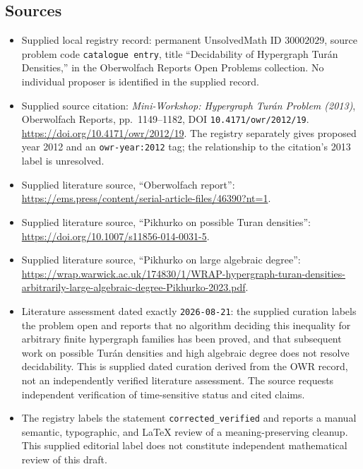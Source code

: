 \documentclass[11pt]{article}
\begin{document}
\subsection{Sources}
\begin{itemize}
\item Supplied local registry record: permanent UnsolvedMath ID \(30002029\), source problem code \texttt{catalogue entry}, title ``Decidability of Hypergraph Tur\'an Densities,'' in the Oberwolfach Reports Open Problems collection. No individual proposer is identified in the supplied record.
\item Supplied source citation: \emph{Mini-Workshop: Hypergraph Tur\'an Problem (2013)}, Oberwolfach Reports, pp.\ 1149--1182, DOI \texttt{10.4171/owr/2012/19}. \url{https://doi.org/10.4171/owr/2012/19}. The registry separately gives proposed year 2012 and an \texttt{owr-year:2012} tag; the relationship to the citation's 2013 label is unresolved.
\item Supplied literature source, ``Oberwolfach report'': \url{https://ems.press/content/serial-article-files/46390?nt=1}.
\item Supplied literature source, ``Pikhurko on possible Turan densities'': \url{https://doi.org/10.1007/s11856-014-0031-5}.
\item Supplied literature source, ``Pikhurko on large algebraic degree'': \url{https://wrap.warwick.ac.uk/174830/1/WRAP-hypergraph-turan-densities-arbitrarily-large-algebraic-degree-Pikhurko-2023.pdf}.
\item Literature assessment dated exactly \texttt{2026-08-21}: the supplied curation labels the problem open and reports that no algorithm deciding this inequality for arbitrary finite hypergraph families has been proved, and that subsequent work on possible Tur\'an densities and high algebraic degree does not resolve decidability. This is supplied dated curation derived from the OWR record, not an independently verified literature assessment. The source requests independent verification of time-sensitive status and cited claims.
\item The registry labels the statement \texttt{corrected\_verified} and reports a manual semantic, typographic, and LaTeX review of a meaning-preserving cleanup. This supplied editorial label does not constitute independent mathematical review of this draft.
\end{itemize}
\end{document}

